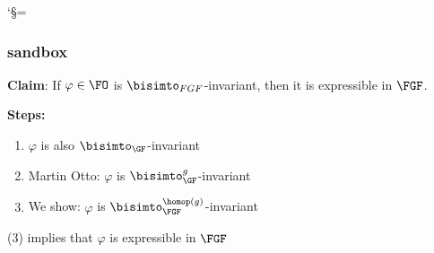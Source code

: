 \documentclass[aspectratio=169]{beamer}
\begin{document}
\catcode`§=\active
\def\dragon{\textcolor{toldarkDarkyellow}{\mathrm{dragon}}}
\def\red{\textcolor{tolhighcontrastRed}{\mathrm{red}}}
\def\blue{\textcolor{tolhighcontrastBlue}{\mathrm{blue}}}
\def\green{\textcolor{tolbrightGreen}{\mathrm{green}}}
\def\fly{\textcolor{tolmutedCyan}{\mathrm{fly}}}
\def\band{\textcolor{black}{\mathrm{band}}}
\def\child{\mathit{child}}
\def\parent{\mathit{parent}}
\def\grandchild{\mathit{grandchild}}
\def\cross{\tikz[baseline, tolhighcontrastRed, yshift=0.6ex, very thick] \draw (45:1ex) -- (45:-1ex) (-45:1ex) -- (-45:-1ex);}
\def\check{\tikz[baseline, tolbrightGreenDarker, yshift=0.6ex, very thick, rounded corners=1pt] \draw (80:1ex) -- ++(80:-2ex) -- ++(160:1ex);}
\begin{frame}\frametitle{sandbox}
  \textbf{Claim}: If $\varphi \in \FO$ is $\bisimto_{FGF}$-invariant, then it is expressible in $\FGF$.\\[3ex]

  \begin{minipage}[t]{0.5\framewidth}
    \textbf{Steps:}
    \vspace{1ex}
    \begin{enumerate}
      \itemsep1ex
      \item $\varphi$ is also $\bisimto_{\GF}$-invariant
      \item Martin Otto: $\varphi$ is $\bisimto_{\GF}^{g}$-invariant
      \item We show: $\varphi$ is $\bisimto_{\FGF}^{\homop(g)}$-invariant
    \end{enumerate}
    \vspace{1ex}
    {(3)} implies that $\varphi$ is expressible in $\FGF$
  \end{minipage}
  \pause
  
\end{frame}
\end{document}
